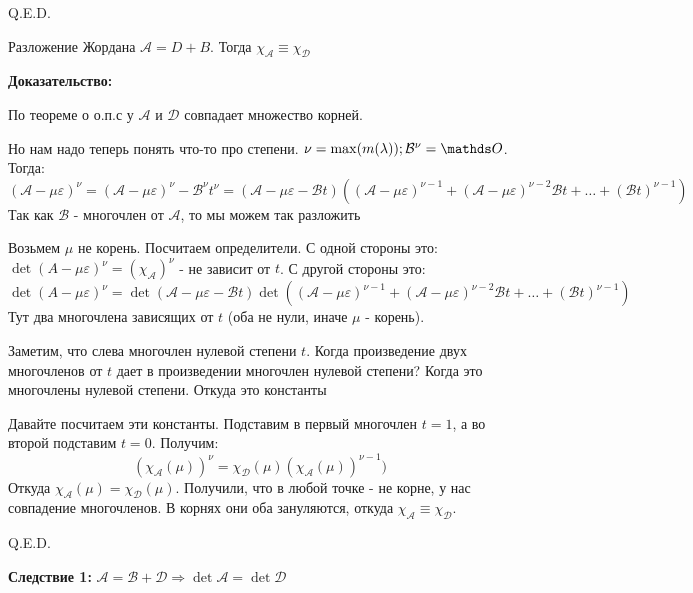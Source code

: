  \hfill Q.E.D.
















Разложение Жордана $\mathcal{A} = D + B$. Тогда
$\chi_{\mathcal{A}}\equiv \chi_\mathcal{D}$

\textbf{Доказательство:}

По теореме о о.п.с у $\mathcal{A}$ и $\mathcal{D}$ совпадает множество корней.

Но нам надо теперь понять что-то про степени. $\nu = \max(m(\lambda)); \mathcal{B}^\nu = \zero$. Тогда:
$$(\mathcal{A}-\mu \varepsilon)^{\nu}=(\mathcal{A}-\mu \varepsilon)^{\nu} - \mathcal{B}^\nu t^\nu = (\mathcal{A-\mu \varepsilon-\mathcal{B}}t)((\mathcal{A}-\mu\varepsilon)^{\nu-1}+ (\mathcal{A}-\mu\varepsilon)^{\nu-2}\mathcal{B}t + \ldots + (\mathcal{B}t)^{\nu-1})$$
Так как $\mathcal{B}$ - многочлен от $\mathcal{A}$, то мы можем так разложить

Возьмем $\mu$ не корень. Посчитаем определители. С одной стороны это:
$\det (A-\mu \varepsilon)^\nu = (\chi_{\mathcal{A}})^\nu$  - не зависит от $t$.
С другой стороны это:
$$\det (A-\mu \varepsilon)^\nu = \det(\mathcal{A-\mu \varepsilon-\mathcal{B}}t)\det ((\mathcal{A}-\mu\varepsilon)^{\nu-1}+ (\mathcal{A}-\mu\varepsilon)^{\nu-2}\mathcal{B}t + \ldots + (\mathcal{B}t)^{\nu-1})$$
Тут два многочлена зависящих от $t$ (оба не нули, иначе $\mu$ - корень).

Заметим, что слева многочлен нулевой степени $t$. Когда произведение двух многочленов от $t$ дает в произведении многочлен нулевой степени? Когда это многочлены нулевой степени. Откуда это константы

Давайте посчитаем эти константы. Подставим в первый многочлен $t=1$, а во второй подставим $t=0$. Получим:
$$(\chi_{\mathcal{A}}(\mu))^{\nu} = \chi_{\mathcal{D}}(\mu) (\chi_{\mathcal{A}}(\mu))^{\nu-1})$$
Откуда $\chi_{\mathcal{A}}(\mu)=\chi_{\mathcal{D}}(\mu)$. Получили, что в любой точке - не корне, у нас совпадение многочленов. В корнях они оба зануляются, откуда $\chi_{\mathcal{A}} \equiv \chi_{\mathcal{D}}$.

\hfill Q.E.D.

\textbf{Следствие 1:} $\mathcal{A} = \mathcal{B} + \mathcal{D} \Rightarrow \det \mathcal{A} =\det \mathcal{D} $

